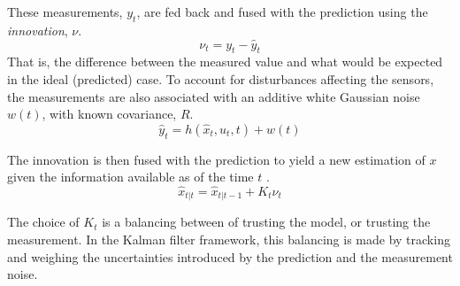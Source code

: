     These measurements, $y_{t}$, are fed back and fused with the
    prediction using the \textit{innovation}, $\nu$.
    \begin{equation}
        \nu_{t} = y_{t} - \hat{y}_{t}
    \end{equation}
    That is, the difference between the measured value and what would be
    expected in the ideal (predicted) case.
    To account for disturbances affecting the sensors, the measurements
    are also associated with an additive white Gaussian noise $w(t)$, with
    known covariance, $R$.
    \begin{equation}
        \hat{y}_{t} = h(\hat{x}_{t}, u_{t}, t) + w(t)
    \end{equation}

    The innovation is then fused with the prediction to yield a new
    estimation of $x$ given the
    information available as of the time $t$ \citep{gustafsson2010statistical}.
    \begin{equation}
        \hat{x}_{t|t} = \hat{x}_{t|t-1} + K_{t}\nu_{t}
    \end{equation}

    The choice of $K_{t}$ is a balancing between of trusting the model,
    or trusting the measurement. In the Kalman filter framework,
    this balancing is made by tracking and weighing the uncertainties
    introduced by the prediction and the measurement noise.

